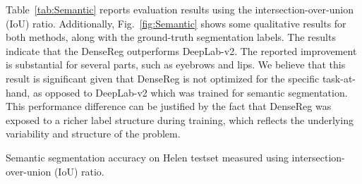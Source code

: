 \documentclass[10pt,twocolumn,letterpaper]{article}
\begin{document}
Table~\ref{tab:Semantic} reports evaluation results using the intersection-over-union (IoU) ratio. Additionally, Fig.~\ref{fig:Semantic} shows some qualitative results for both methods, along with the ground-truth segmentation labels. The results indicate that the DenseReg outperforms DeepLab-v2. The reported improvement is substantial for several parts, such as eyebrows and lips. We believe that this result is significant given that DenseReg is not optimized for the specific task-at-hand, as opposed to DeepLab-v2 which was trained for semantic segmentation. This performance difference can be justified by the fact that DenseReg was exposed to a  richer label structure during training, which reflects the underlying variability and structure of the problem. 

\centering
{}
\caption{Semantic segmentation accuracy on Helen testset measured using intersection-over-union (IoU) ratio.}
\vspace{-0.05cm}
\label{tab:Semantic}
\end{document}
